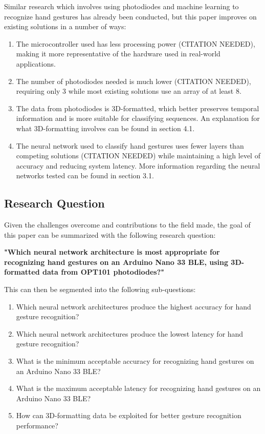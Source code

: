 Similar research which involves using photodiodes and machine learning to recognize hand gestures has already been conducted, but this paper improves on existing solutions in a number of ways:
\begin{enumerate}
    \item The microcontroller used has less processing power (CITATION NEEDED), making it more representative of the hardware used in real-world applications.
    \item The number of photodiodes needed is much lower (CITATION NEEDED), requiring only 3 while most existing solutions use an array of at least 8.
    \item The data from photodiodes is 3D-formatted, which better preserves temporal information and is more suitable for classifying sequences.
    An explanation for what 3D-formatting involves can be found in section 4.1\@.
    \item The neural network used to classify hand gestures uses fewer layers than competing solutions (CITATION NEEDED) while maintaining a high level of accuracy and reducing system latency.
    More information regarding the neural networks tested can be found in section 3.1\@.
\end{enumerate}

\subsection{Research Question}\label{subsec:research-question}
Given the challenges overcome and contributions to the field made, the goal of this paper can be summarized with the following research question:

\textbf{"Which neural network architecture is most appropriate for recognizing hand gestures on an Arduino Nano 33 BLE, using 3D-formatted data from OPT101 photodiodes?"}

This can then be segmented into the following sub-questions:
\begin{enumerate}
    \item Which neural network architectures produce the highest accuracy for hand gesture recognition?
    \item Which neural network architectures produce the lowest latency for hand gesture recognition?
    \item What is the minimum acceptable accuracy for recognizing hand gestures on an Arduino Nano 33 BLE?
    \item What is the maximum acceptable latency for recognizing hand gestures on an Arduino Nano 33 BLE?
    \item How can 3D-formatting data be exploited for better gesture recognition performance?
\end{enumerate}


